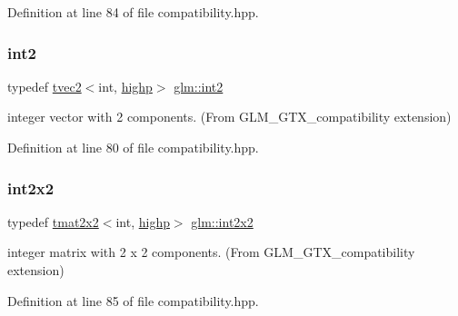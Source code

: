 Definition at line 84 of file compatibility.\+hpp.

\mbox{\label{group__gtx__compatibility_ga89f98d125d3e73b50e34bc35d93796f1}} 
\subsubsection{\texorpdfstring{int2}{int2}}
{\footnotesize\ttfamily typedef \mbox{\hyperlink{structglm_1_1tvec2}{tvec2}}$<$int, \mbox{\hyperlink{namespaceglm_a0f04f086094c747d227af4425893f545ac6f7eab42eacbb10d59a58e95e362074}{highp}}$>$ \mbox{\hyperlink{group__gtx__compatibility_ga89f98d125d3e73b50e34bc35d93796f1}{glm\+::int2}}}



integer vector with 2 components. (From G\+L\+M\+\_\+\+G\+T\+X\+\_\+compatibility extension) 



Definition at line 80 of file compatibility.\+hpp.

\mbox{\label{group__gtx__compatibility_ga5f407f808d8fa5b771ea7417cedc4868}} 
\subsubsection{\texorpdfstring{int2x2}{int2x2}}
{\footnotesize\ttfamily typedef \mbox{\hyperlink{structglm_1_1tmat2x2}{tmat2x2}}$<$int, \mbox{\hyperlink{namespaceglm_a0f04f086094c747d227af4425893f545ac6f7eab42eacbb10d59a58e95e362074}{highp}}$>$ \mbox{\hyperlink{group__gtx__compatibility_ga5f407f808d8fa5b771ea7417cedc4868}{glm\+::int2x2}}}



integer matrix with 2 x 2 components. (From G\+L\+M\+\_\+\+G\+T\+X\+\_\+compatibility extension) 



Definition at line 85 of file compatibility.\+hpp.

\mbox{\label{group__gtx__compatibility_ga37b2b18255fa5ff7fa23d8b1d34b8034}} 
